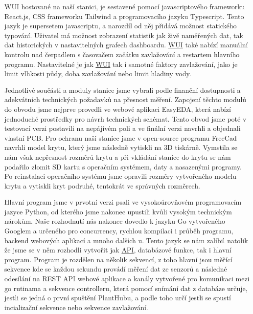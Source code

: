 \documentclass[12pt,a4paper]{article}
\begin{document}
\underline{\ac{WUI}} hostované na naší stanici, je sestavené pomocí javascriptového frameworku React.js, CSS frameworku Tailwind a programovacího jazyku Typescript. Tento jazyk je supersetem javascriptu, a narozdíl od něj přidává možnost statického typování. Uživatel má možnost zobrazení statistik jak živě naměřených dat, tak dat historických v nastavitelných grafech dashboardu. \underline{\ac{WUI}} také nabízí manuální kontrolu nad čerpadlem s časovačem začátku zavlažování a restartem hlavního programu. Nastavitelné je jak \underline{\ac{WUI}} tak i samotné faktory zavlažování, jako je limit vlhkosti půdy, doba zavlažování nebo limit hladiny vody.

Jednotlivé součásti a moduly stanice jsme vybrali podle finanční dostupnosti a adekvátních technických požadavků na přesnost měření. Zapojení těchto modulů do obvodu jsme nejprve provedli ve webové aplikaci EasyEDA, která nabízí jednoduché prostředky pro návrh technických schémat. Tento obvod jsme poté v testovací verzi postavili na nepájivém poli a ve finální verzi navrhli a objednali vlastní \ac{PCB}. Pro ochranu naší stanice jsme v open-source programu FreeCad navrhli model krytu, který jsme následně vytiskli na 3D tiskárně. Vymstila se nám však nepřesnost rozměrů krytu a při vkládání stanice do krytu se nám podařilo zlomit SD kartu s operačním systémem, daty a nasazenými programy. Po reinstalaci operačního systému jsme opravili rozměry vytvořeného modelu krytu a vytiskli kryt podruhé, tentokrát ve správných rozměrech.

Hlavní program jsme v prvotní verzi psali ve vysokoúrovňovém programovacím jazyce Python, od kterého jsme nakonec upustili kvůli vysokým technickým nárokům. Naše rozhodnutí nás nakonec dovedlo k jazyku Go vytvořeného Googlem a určeného pro concurrency, rychlou kompilaci i průběh programu, backend webových aplikací a mnoho dalších u. Tento jazyk se nám zalíbil natolik že jsme se v něm rozhodli vytvořit jak \underline{\ac{API}}, databázové funkce, tak i hlavní program. Program je rozdělen na několik sekvencí, z toho hlavní jsou měřící sekvence kde se každou sekundu provádí měření dat ze senzorů a následné odesílání na \underline{\ac{REST}} \space \underline{\ac{API}} webové aplikace a kanály vytvořené pro komunikaci mezi go rutinama a sekvence controlleru, která pomocí snímání dat z databáze určuje, jestli se jedná o první spuštění PlantHubu, a podle toho určí jestli se spustí incializační sekvence nebo sekvence zavlažování.

\clearpage
\end{document}
